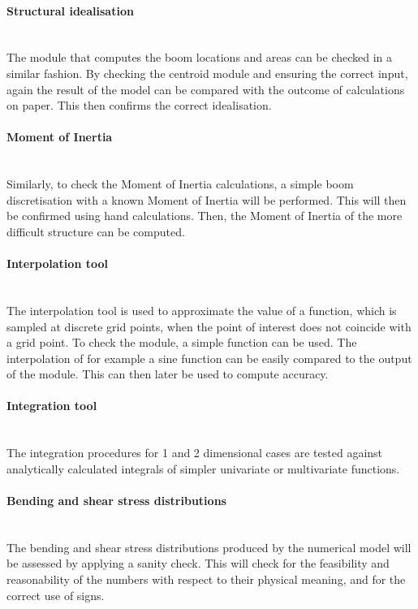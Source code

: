 \paragraph{Structural idealisation}\mbox{}\\
\noindent The module that computes the boom locations and areas can be checked in a similar fashion. By checking the centroid module and ensuring the correct input, again the result of the model can be compared with the outcome of calculations on paper. This then confirms the correct idealisation.

\paragraph{Moment of Inertia}\mbox{}\\
\noindent Similarly, to check the Moment of Inertia calculations, a simple boom discretisation with a known Moment of Inertia will be performed. This will then be confirmed using hand calculations. Then, the Moment of Inertia of the more difficult structure can be computed.

\paragraph{Interpolation tool}\mbox{}\\
\noindent The interpolation tool is used to approximate the value of a function, which is sampled at discrete grid points, when the point of interest does not coincide with a grid point. To check the module, a simple function can be used. The interpolation of for example a sine function can be easily compared to the output of the module. This can then later be used to compute accuracy.

\paragraph{Integration tool}\mbox{}\\
\noindent The integration procedures for 1 and 2 dimensional cases are tested against analytically calculated integrals of simpler univariate or multivariate functions.

\paragraph{Bending and shear stress distributions}\mbox{}\\
\noindent The bending and shear stress distributions produced by the numerical model will be assessed by applying a sanity check. This will check for the feasibility and reasonability of the numbers with respect to their physical meaning, and for the correct use of signs.

